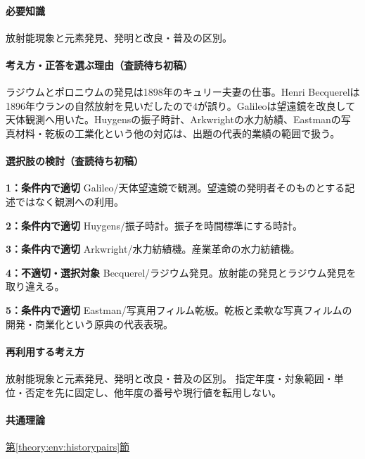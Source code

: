 \paragraph{必要知識} 放射能現象と元素発見、発明と改良・普及の区別。

\paragraph{考え方・正答を選ぶ理由（査読待ち初稿）} ラジウムとポロニウムの発見は1898年のキュリー夫妻の仕事。Henri Becquerelは1896年ウランの自然放射を見いだしたので4が誤り。Galileoは望遠鏡を改良して天体観測へ用いた。Huygensの振子時計、Arkwrightの水力紡績、Eastmanの写真材料・乾板の工業化という他の対応は、出題の代表的業績の範囲で扱う。

\paragraph{選択肢の検討（査読待ち初稿）}\mbox{}\par

\noindent\textbf{1：条件内で適切} Galileo/天体望遠鏡で観測。望遠鏡の発明者そのものとする記述ではなく観測への利用。\par

\noindent\textbf{2：条件内で適切} Huygens/振子時計。振子を時間標準にする時計。\par

\noindent\textbf{3：条件内で適切} Arkwright/水力紡績機。産業革命の水力紡績機。\par

\noindent\textbf{4：不適切・選択対象} Becquerel/ラジウム発見。放射能の発見とラジウム発見を取り違える。\par

\noindent\textbf{5：条件内で適切} Eastman/写真用フィルム乾板。乾板と柔軟な写真フィルムの開発・商業化という原典の代表表現。\par

\paragraph{再利用する考え方} 放射能現象と元素発見、発明と改良・普及の区別。 指定年度・対象範囲・単位・否定を先に固定し、他年度の番号や現行値を転用しない。

\paragraph{共通理論} \hyperref[theory:env:historypairs]{第\ref*{theory:env:historypairs}節}

